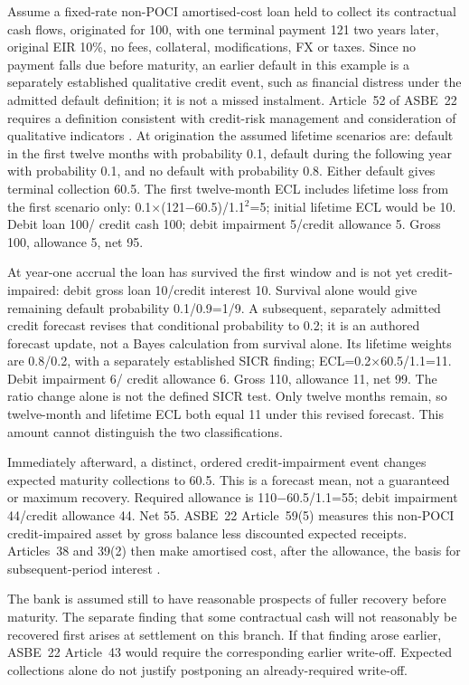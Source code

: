 Assume a fixed-rate non-POCI amortised-cost loan held to collect its contractual cash flows, originated for 100, with one terminal payment 121 two years later, original EIR 10\%, no fees, collateral, modifications, FX or taxes. Since no payment falls due before maturity, an earlier default in this example is a separately established qualitative credit event, such as financial distress under the admitted default definition; it is not a missed instalment. Article~52 of ASBE~22 requires a definition consistent with credit-risk management and consideration of qualitative indicators \citep{mofasbe22}. At origination the assumed lifetime scenarios are: default in the first twelve months with probability 0.1, default during the following year with probability 0.1, and no default with probability 0.8. Either default gives terminal collection 60.5. The first twelve-month ECL includes lifetime loss from the first scenario only: 0.1\ensuremath{\times}(121\ensuremath{-}60.5)/1.1\ensuremath{^2}=5; initial lifetime ECL would be 10. Debit loan 100/ credit cash 100; debit impairment 5/credit allowance 5. Gross 100, allowance 5, net 95.

At year-one accrual the loan has survived the first window and is not yet credit-impaired: debit gross loan 10/credit interest 10. Survival alone would give remaining default probability 0.1/0.9=1/9. A subsequent, separately admitted credit forecast revises that conditional probability to 0.2; it is an authored forecast update, not a Bayes calculation from survival alone. Its lifetime weights are 0.8/0.2, with a separately established SICR finding; ECL=0.2\ensuremath{\times}60.5/1.1=11. Debit impairment 6/ credit allowance 6. Gross 110, allowance 11, net 99. The ratio change alone is not the defined SICR test. Only twelve months remain, so twelve-month and lifetime ECL both equal 11 under this revised forecast. This amount cannot distinguish the two classifications.

Immediately afterward, a distinct, ordered credit-impairment event changes expected maturity collections to 60.5. This is a forecast mean, not a guaranteed or maximum recovery. Required allowance is 110\ensuremath{-}60.5/1.1=55; debit impairment 44/credit allowance 44. Net 55. ASBE~22 Article~59(5) measures this non-POCI credit-impaired asset by gross balance less discounted expected receipts. Articles~38 and 39(2) then make amortised cost, after the allowance, the basis for subsequent-period interest \citep{mofasbe22}.

The bank is assumed still to have reasonable prospects of fuller recovery before maturity. The separate finding that some contractual cash will not reasonably be recovered first arises at settlement on this branch. If that finding arose earlier, ASBE~22 Article~43 would require the corresponding earlier write-off. Expected collections alone do not justify postponing an already-required write-off.

